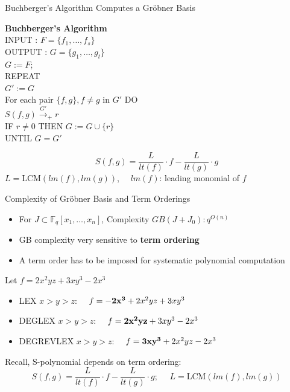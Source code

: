 \documentclass[xcolor=dvipsnames]{beamer}
\begin{document}
\begin{frame}{\large{Buchberger's Algorithm Computes a Gr\"obner Basis}}

{\bf Buchberger's Algorithm}\\
 INPUT : $F = \{f_1, \dots, f_s\}$\\
 OUTPUT : $G = \{g_1,\dots ,g_t\}$\\ %
  $G:= F$; \\
  REPEAT\\
  \hspace{0.1in} $G' := G$\\
  \hspace{0.1in} For each pair $\{f, g\}, f \neq g$ in $G'$ DO\\
\hspace{0.2in}  $S(f, g) \stackrel{G'}{\textstyle\longrightarrow}_+
r$ \\
\hspace{0.2in}  IF $r \neq 0$ THEN $G:= G \cup \{r\}$ \\
UNTIL $G = G'$

\[
S(f,g)=\frac{L}{lt(f)}\cdot f - \frac{L}{lt(g)}\cdot g
\]
$L = \text{LCM}(lm(f), lm(g))$, ~~$lm(f)$: leading monomial of $f$

\end{frame}


\begin{frame}{\large {Complexity of Gr\"obner Basis and Term Orderings}}
\begin{itemize}
\item For $J \subset \mathbb{F}_q[x_1, \dots, x_n]$, Complexity
  $GB(J + J_0): q^{O(n)}$
\item GB complexity very sensitive to {\bf term ordering}
\item A term order has to be imposed for systematic polynomial computation
\end{itemize}

Let $f = 2x^2yz + 3xy^3 - 2x^3$
\begin{itemize}
\item LEX $x> y> z$: ~~$f = {\bf -2x^3} + 2x^2yz + 3xy^3$
\item  DEGLEX $x>y>z$:  ~~$f = {\bf 2x^2yz} + 3xy^3 -2x^3$
\item DEGREVLEX $x>y>z$: ~~$f = {\bf 3xy^3} + 2x^2yz - 2x^3$
\end{itemize}
Recall, S-polynomial depends on term ordering:
\[
S(f,g)=\frac{L}{lt(f)}\cdot f - \frac{L}{lt(g)}\cdot g;
~~~~~~L = \text{LCM}(lm(f), lm(g))
\]

\end{frame}
\end{document}
